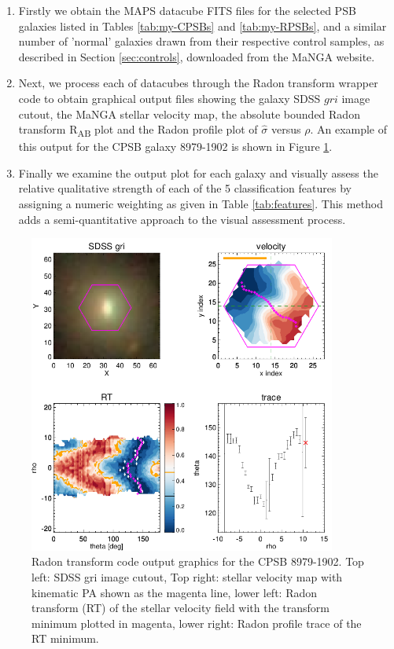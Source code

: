 \begin{enumerate}
    \item Firstly we obtain the MAPS datacube FITS files for the selected PSB galaxies listed in Tables \ref{tab:my-CPSBs} and \ref{tab:my-RPSBs}, and a similar number of 'normal' galaxies drawn from their respective control samples, as described in Section \ref{sec:controls}, downloaded from the MaNGA website.
    \item Next, we process each of datacubes through the Radon transform wrapper code to obtain graphical output files showing the galaxy SDSS $gri$ image cutout, the MaNGA stellar velocity map, the absolute bounded Radon transform R\textsubscript{AB} plot and the Radon profile plot of $\hat{\sigma}$ versus $\rho$. An example of this output for the CPSB galaxy 8979-1902 is shown in Figure \ref{fig:CPSB-8979-1902-SNIP}. 
    \item  Finally we examine the output plot for each galaxy and visually assess the relative qualitative strength of each of the 5 classification features by assigning a numeric weighting as given in Table \ref{tab:features}. This method adds a semi-quantitative approach to the visual assessment process.
\end{enumerate}

\begin{figure}
    \centering
    \includegraphics[width=0.9\textwidth]{images/RadonPlots/RT-SNIPS-NEW/CPSB-8979-1902-SNIP.png}
    \caption[Radon transform code output graphics for the CPSB 8979-1902]{Radon transform code output graphics for the CPSB 8979-1902. Top left: SDSS gri image cutout, Top right: stellar velocity map with kinematic PA shown as the magenta line, lower left: Radon transform (RT) of the stellar velocity field with the transform minimum plotted in magenta, lower right: Radon profile trace of the RT minimum.}
    \label{fig:CPSB-8979-1902-SNIP}
\end{figure}

